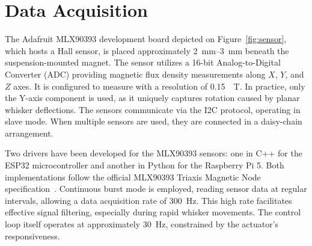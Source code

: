 \section{Data Acquisition}

The Adafruit MLX90393 development board depicted on Figure~\ref{fig:sensor}, which hosts a Hall sensor, is placed approximately \qtyrange{2}{3}{\milli\metre} beneath the suspension-mounted magnet.
The sensor utilizes a 16-bit Analog-to-Digital Converter (ADC) providing magnetic flux density measurements along $X$, $Y$, and $Z$ axes.
It is configured to measure with a resolution of \SI{0.15}{\mu\tesla}.
In practice, only the Y-axis component is used, as it uniquely captures rotation caused by planar whisker deflections.
The sensors communicate via the I2C protocol, operating in slave mode.
When multiple sensors are used, they are connected in a daisy-chain arrangement.

Two drivers have been developed for the MLX90393 sensors: one in C++ for the ESP32 microcontroller and another in Python for the Raspberry Pi 5.
Both implementations follow the official MLX90393 Triaxis Magnetic Node specification~\cite{MLX90393}.
Continuous burst mode is employed, reading sensor data at regular intervals, allowing a data acquisition rate of \SI{300}{\hertz}.
This high rate facilitates effective signal filtering, especially during rapid whisker movements.
The control loop itself operates at approximately \SI{30}{\hertz}, constrained by the actuator's responsiveness.

